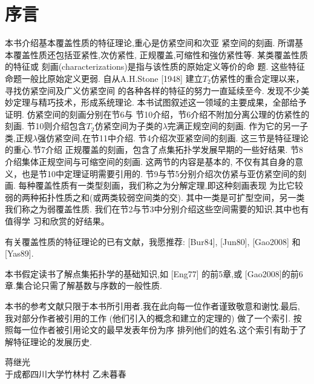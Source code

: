 \chapter*{序\quad 言}

\setcounter{page}{1}
\thispagestyle{empty}

本书介绍基本覆盖性质的特征理论,重心是仿紧空间和次亚
紧空间的刻画.
所谓基本覆盖性质还包括亚紧性,次仿紧性,
正规覆盖,可缩性和強仿紧性等.
某类覆盖性质的特征或
刻画(characterizations)是指与该性质的原始定义等价的命
题.
这些特征命题一般比原始定义更弱.
自从A.H.Stone [1948]
建立$T_2$仿紧性的重合定理以来，寻找仿紧空间及广义仿紧空间
的各种各样的特征的努力一直延续至今.
发现不少美妙定理与精巧技术，形成系统理论.
本书试图叙述这一领域的主要成果，全部给予证明.
仿紧空间的刻画分别在节6与
节10介绍，节6介绍不附加分离公理的仿紧性的刻画.
节10则介绍包含$T_2$仿紧空间为子类的$\lambda$完满正规空间的刻画.
作为它的另一子类,正规$\lambda$强仿紧空间,在节11中介绍.
节4介绍次亚紧空间的刻画.
这三节是特征理论的重心.节7介绍
正规覆盖的刻画，包含了点集拓扑学发展早期的一些好结果.
节8介绍集体正规空间与可缩空间的刻画.
这两节的内容是基本的, 不仅有其自身的意义，也是节10中定理证明需要引用的.
节9与节5分别介绍次仿紧与亚仿紧空间的刻画.
每种覆盖性质有一类型刻画，我们称之为分解定理,即这种刻画表现
为比它较弱的两种拓扑性质之和(或两类较弱空间类的交).
其中一类是可扩型空间，另一类我们称之为弱覆盖性质.
我们在节2与节3中分别介绍这些空间需要的知识.其中也有值得学
习和欣赏的好结果。

有关覆盖性质的特征理论的已有文献，我愿推荐: [Bur84], [Jun80], [Gao2008] 和 [Yas89].

本书假定读书了解点集拓扑学的基础知识,如 [Eng77] 的前5章,或
[Gao2008]的前6章.集合论只需了解基数与序数的一般性质.

本书的参考文献只限于本书所引用者.我在此向每一位作者谨致敬意和谢忱.最后, 我对部分作者被引用的工作 (他们引入的概念和建立的定理的) 做了一个索引.
按照每一位作者被引用论文的最早发表年份为序
排列他们的姓名.这个索引有助于了解特征理论的发展历史.

{\kaishu
	\begin{center}
		\hspace*{88mm}蒋继光\\
		\hspace{88mm}于成都四川大学竹林村
		\hspace*{88mm}乙未暮春
	\end{center}
}


